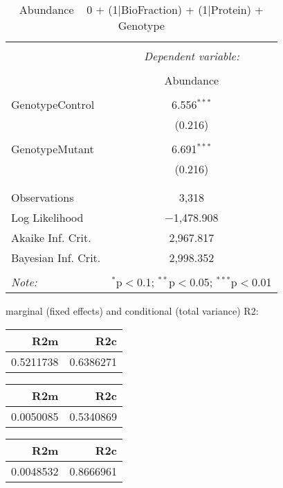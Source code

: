 \documentclass[11pt]{report}
\begin{document}
\begin{table}[!htbp] \centering 
  \caption{Abundance ~ 0 + (1|BioFraction) + (1|Protein) + Genotype} 
  \label{} 
\begin{tabular}{@{\extracolsep{5pt}}lc} 
\\[-1.8ex]\hline 
\hline \\[-1.8ex] 
 & \multicolumn{1}{c}{\textit{Dependent variable:}} \\ 
\cline{2-2} 
\\[-1.8ex] & Abundance \\ 
\hline \\[-1.8ex] 
 GenotypeControl & 6.556$^{***}$ \\ 
  & (0.216) \\ 
  & \\ 
 GenotypeMutant & 6.691$^{***}$ \\ 
  & (0.216) \\ 
  & \\ 
\hline \\[-1.8ex] 
Observations & 3,318 \\ 
Log Likelihood & $-$1,478.908 \\ 
Akaike Inf. Crit. & 2,967.817 \\ 
Bayesian Inf. Crit. & 2,998.352 \\ 
\hline 
\hline \\[-1.8ex] 
\textit{Note:}  & \multicolumn{1}{r}{$^{*}$p$<$0.1; $^{**}$p$<$0.05; $^{***}$p$<$0.01} \\ 
\end{tabular} 
\end{table} 
marginal (fixed effects) and conditional (total variance) R2:

\begin{tabular}{r|r}
\hline
R2m & R2c\\
\hline
0.5211738 & 0.6386271\\
\hline
\end{tabular}

\begin{tabular}{r|r}
\hline
R2m & R2c\\
\hline
0.0050085 & 0.5340869\\
\hline
\end{tabular}

\begin{tabular}{r|r}
\hline
R2m & R2c\\
\hline
0.0048532 & 0.8666961\\
\hline
\end{tabular}
\end{document}
